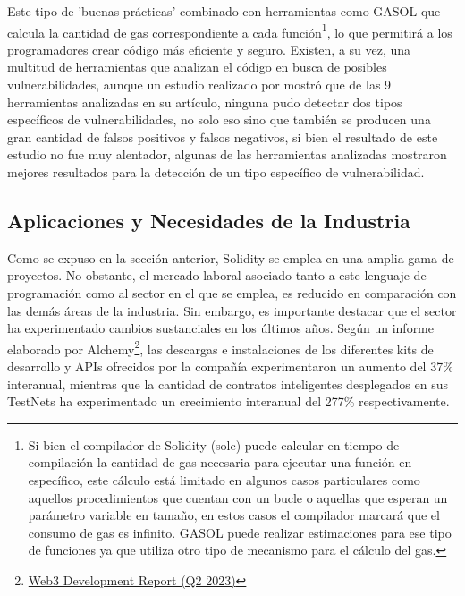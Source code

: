 \documentclass[a4paper,10pt]{article}
\begin{document}
	Este tipo de 'buenas prácticas' combinado con herramientas como GASOL \parencite{albert2020gasol} que calcula la cantidad de gas correspondiente a cada función\footnote{Si bien el compilador de Solidity (solc) puede calcular en tiempo de compilación la cantidad de gas necesaria para ejecutar una función en específico, este cálculo está limitado en algunos casos particulares como aquellos procedimientos que cuentan con un bucle o aquellas que esperan un parámetro variable en tamaño, en estos casos el compilador marcará que el consumo de gas es infinito. GASOL puede realizar estimaciones para ese tipo de funciones ya que utiliza otro tipo de mecanismo para el cálculo del gas.}, lo que permitirá a los programadores crear código más eficiente y seguro. Existen, a su vez, una multitud de herramientas que analizan el código en busca de posibles vulnerabilidades, aunque un estudio realizado por \textcite{durieux2020empirical} mostró que de las 9 herramientas analizadas en su artículo, ninguna pudo detectar dos tipos específicos de vulnerabilidades, no solo eso sino que también se producen una gran cantidad de falsos positivos y falsos negativos, si bien el resultado de este estudio no fue muy alentador, algunas de las herramientas analizadas mostraron mejores resultados para la detección de un tipo específico de vulnerabilidad.
	\subsection{Aplicaciones y Necesidades de la Industria}
	Como se expuso en la sección anterior, Solidity se emplea en una amplia gama de proyectos. No obstante, el mercado laboral asociado tanto a este lenguaje de programación como al sector en el que se emplea, es reducido en comparación con las demás áreas de la industria. Sin embargo, es importante destacar que el sector ha experimentado cambios sustanciales en los últimos años. Según un informe elaborado por Alchemy\footnote{\href{https://www.alchemy.com/blog/web3-developer-report-q2-2023}{Web3 Development Report (Q2 2023)}}, las descargas e instalaciones de los diferentes kits de desarrollo y APIs ofrecidos por la compañía experimentaron un aumento del 37\% interanual, mientras que la cantidad de contratos inteligentes desplegados en sus TestNets ha experimentado un crecimiento interanual del 277\% respectivamente.
	
\end{document}
